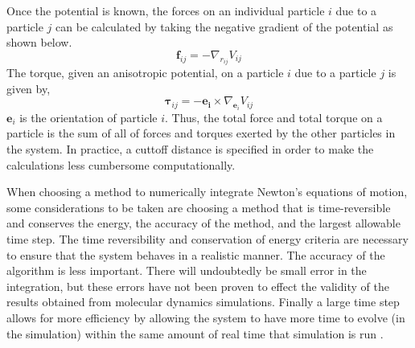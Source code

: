 \documentclass[preprint, aps]{revtex4-1}
\begin{document}
Once the potential is known, the forces on an individual particle $i$ due to a 
particle $j$ can be calculated by taking the negative gradient of the potential 
as shown below.
	\begin{equation} \label{force}
		\mathbf{f}_{ij}=-\nabla_{r_{ij}}V_{ij}
	\end{equation}
The torque, given an anisotropic potential, on a particle $i$ due to a particle 
$j$ is given by,
	\begin{equation} \label{torque}
		\mathbf{\tau}_{ij}=-\mathbf{e_i}\times\nabla_{\mathbf{e}_{i}}V_{ij}
	\end{equation}
$\mathbf{e}_{i}$ is the orientation of particle $i$. Thus, the total force and 
total torque on a particle is the sum of all of forces and torques exerted by 
the other particles in the system. In practice, a cuttoff distance is specified 
in order to make the calculations less cumbersome computationally.
	
When choosing a method to numerically integrate Newton's equations of motion, 
some considerations to be taken are choosing a method that is time-reversible 
and conserves the energy, the accuracy of the method, and the largest allowable 
time step. The time reversibility and conservation of energy criteria are 
necessary to ensure that the system behaves in a realistic manner. The accuracy 
of the algorithm is less important. There will undoubtedly be small error in the 
integration, but these errors have not been proven to effect the validity of the 
results obtained from molecular dynamics simulations. Finally a large time step
allows for more efficiency by allowing the system to have more time to evolve 
(in the simulation) within the same amount of real time that simulation is run
\cite{frenke01}.
\end{document}
